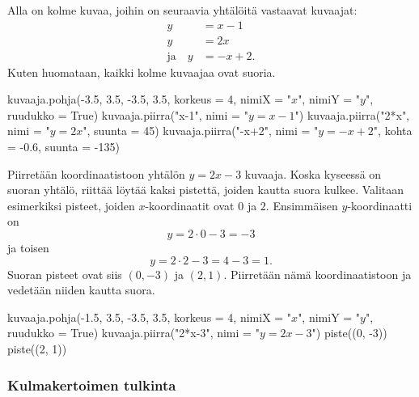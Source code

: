 
Alla on kolme kuvaa, joihin on seuraavia yhtälöitä vastaavat kuvaajat:
\begin{align*}
y & =x-1 \\
y & =2x \\
\text{ja} \quad y & =-x+2.
\end{align*}
Kuten huomataan, kaikki kolme kuvaajaa ovat suoria.

\begin{kuva}
    kuvaaja.pohja(-3.5, 3.5, -3.5, 3.5, korkeus = 4, nimiX = "$x$", nimiY = "$y$", ruudukko = True)
    kuvaaja.piirra("x-1", nimi = "$y=x-1$")
    kuvaaja.piirra("2*x", nimi = "$y=2x$", suunta = 45)
    kuvaaja.piirra("-x+2", nimi = "$y=-x+2$", kohta = -0.6, suunta = -135)
\end{kuva}




\begin{esimerkki} Piirretään koordinaatistoon yhtälön $y=2x-3$ kuvaaja. Koska kyseessä on suoran yhtälö, riittää löytää kaksi pistettä, joiden kautta suora kulkee.
Valitaan esimerkiksi pisteet, joiden $x$-koordinaatit ovat $0$ ja $2$. Ensimmäisen $y$-koordinaatti on
\[
y=2\cdot 0-3=-3
\]
ja toisen
\[
y=2\cdot 2-3=4-3=1.
\]
Suoran pisteet ovat siis $(0, -3)$ ja $(2, 1)$. Piirretään nämä koordinaatistoon ja vedetään niiden kautta suora.

\begin{kuva}
    kuvaaja.pohja(-1.5, 3.5, -3.5, 3.5, korkeus = 4, nimiX = "$x$", nimiY = "$y$", ruudukko = True)
    kuvaaja.piirra("2*x-3", nimi = "$y=2x-3$")
    piste((0, -3))
    piste((2, 1))
\end{kuva}

\end{esimerkki}

\subsubsection*{Kulmakertoimen tulkinta}

